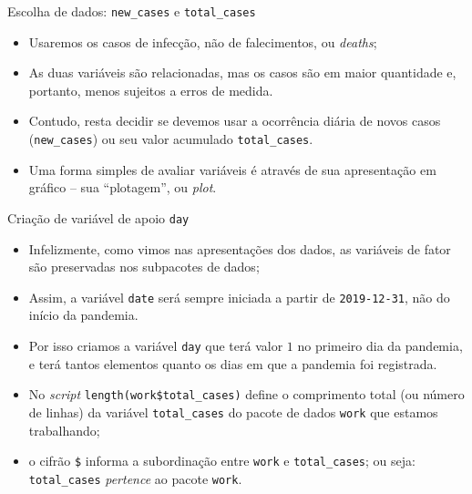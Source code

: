 \documentclass[a4paper,10pt]{beamer}
\begin{document}
\begin{frame}{ Escolha de dados: {\tt new\_cases} e {\tt total\_cases} }
  \begin{itemize}
      \item Usaremos os casos de infecção, não de falecimentos, ou {\em deaths};
      \item As duas variáveis são relacionadas, mas os casos são em 
	  maior quantidade e, portanto, menos sujeitos a erros de medida.
      \item Contudo, resta decidir se devemos usar a ocorrência diária de 
	  novos casos ({\tt new\_cases}) ou seu valor acumulado 
	  {\tt total\_cases}.	
      \item Uma forma simples de avaliar variáveis é através de sua 
	  apresentação em gráfico -- sua ``plotagem'', ou {\em plot}.
  \end{itemize}

\end{frame}

\begin{frame}{ Criação de variável de apoio {\tt day}}
  
  
  \begin{itemize}
      \item Infelizmente, como vimos nas apresentações dos dados, as variáveis
	  de fator são preservadas nos subpacotes de dados;
	  
      \item Assim, a variável {\tt date} será sempre iniciada a partir de 
	  {\tt 2019-12-31}, não do início da pandemia.
	  
      \item Por isso criamos a variável {\tt day} que terá valor $1$ no 
	  primeiro dia da pandemia, e terá tantos elementos quanto os dias 
	  em que a pandemia foi registrada.
	  
      \item No {\em script} {\tt length(work\$total\_cases)} 
	  define o comprimento total (ou número de linhas) da variável 
	  {\tt total\_cases} do pacote de dados {\tt work} que estamos 
	  trabalhando;
      \item o cifrão {\tt \$} informa a subordinação entre {\tt work} e 
	  {\tt total\_cases}; ou seja: {\tt total\_cases} {\em pertence} 
	  ao pacote {\tt work}.
  \end{itemize}

\end{frame}
\end{document}
